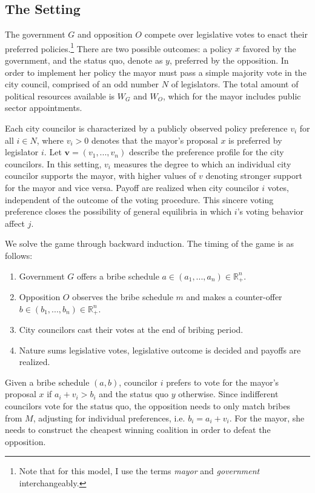 \documentclass[12pt,a4paper]{article}
\newcommand{\real}{\mathbb{R}_+^n}
\begin{document}
\subsection*{The Setting}

The government $G$ and opposition $O$ compete over legislative votes to enact their preferred policies.\footnote{Note that for this model, I use the terms \emph{mayor} and \emph{government} interchangeably.} There are two possible outcomes: a policy $x$ favored by the government, and the status quo, denote as $y$, preferred by the opposition. In order to implement her policy the mayor must pass a simple majority vote in the city council, comprised of an odd number $N$ of legislators. The total amount of political resources available is $W_G$ and $W_O$, which for the mayor includes public sector appointments.

Each city councilor is characterized by a publicly observed policy preference $v_i$ for all $i \in N$, where $v_i > 0$ denotes that the mayor's proposal $x$ is preferred by legislator $i$. Let $\mathbf{v} = (v_1, ..., v_n)$ describe the preference profile for the city councilors. In this setting, $v_i$ measures the degree to which an individual city councilor supports the mayor, with higher values of $v$ denoting stronger support for the mayor and vice versa. Payoff are realized when city councilor $i$ votes, independent of the outcome of the voting procedure. This sincere voting preference closes the possibility of general equilibria in which $i$'s voting behavior affect $j$.

We solve the game through backward induction. The timing of the game is as follows:

\begin{enumerate}
    \item Government $G$ offers a bribe schedule $a \in (a_1, ..., a_n) \in \real$.
    \item Opposition $O$ observes the bribe schedule $m$ and makes a counter-offer $b \in (b_1, ..., b_n) \in \real$.
    \item City councilors cast their votes at the end of bribing period.
    \item Nature sums legislative votes, legislative outcome is decided and payoffs are realized.
\end{enumerate}

Given a bribe schedule $(a, b)$, councilor $i$ prefers to vote for the mayor's proposal $x$ if $a_i + v_i > b_i$ and the status quo $y$ otherwise. Since indifferent councilors vote for the status quo, the opposition needs to only match bribes from $M$, adjusting for individual preferences, i.e. $b_i = a_i + v_i$. For the mayor, she needs to construct the cheapest winning coalition in order to defeat the opposition. 
\end{document}

